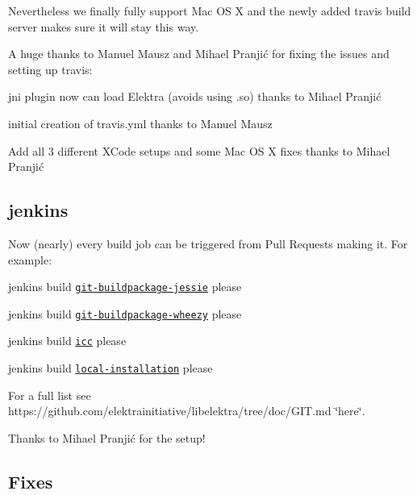 Nevertheless we finally fully support Mac O\+S X and the newly added travis build server makes sure it will stay this way.

A huge thanks to Manuel Mausz and Mihael Pranjić for fixing the issues and setting up travis\+:


\begin{DoxyItemize}
\item jni plugin now can load Elektra (avoids using {\ttfamily .so}) thanks to Mihael Pranjić
\item initial creation of travis.\+yml thanks to Manuel Mausz
\item Add all 3 different X\+Code setups and some Mac O\+S X fixes thanks to Mihael Pranjić
\end{DoxyItemize}

\subsection*{jenkins}

Now (nearly) every build job can be triggered from Pull Requests making it. For example\+:


\begin{DoxyItemize}
\item jenkins build \href{http://build.libelektra.org:8080/job/elektra-git-buildpackage-jessie/}{\tt git-\/buildpackage-\/jessie} please
\item jenkins build \href{http://build.libelektra.org:8080/job/elektra-git-buildpackage-wheezy/}{\tt git-\/buildpackage-\/wheezy} please
\item jenkins build \href{http://build.libelektra.org:8080/job/elektra-icc/}{\tt icc} please
\item jenkins build \href{http://build.libelektra.org:8080/job/elektra-local-installation/}{\tt local-\/installation} please
\end{DoxyItemize}

For a full list see https\+://github.com/elektrainitiative/libelektra/tree/doc/\+G\+I\+T.\+md \char`\"{}here\char`\"{}.

Thanks to Mihael Pranjić for the setup!

\subsection*{Fixes}


